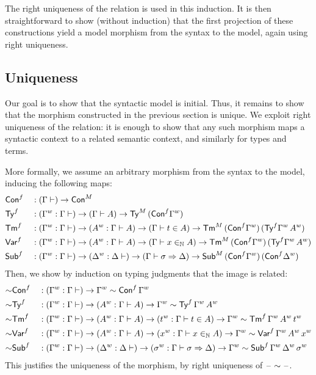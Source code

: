   The right uniqueness of the relation is used in this induction. It is then
straightforward to show (without induction) that the first projection of these
constructions yield a model morphism from the syntax to the model, again using
right uniqueness.
\subsection{Uniqueness}
Our goal is to show that the syntactic model is initial. Thus, it remains to
show that the morphism constructed in the previous section is unique. We exploit
right uniqueness of the relation: it is enough to show that any such morphism
maps a syntactic context to a related semantic context, and similarly for types
and terms.

More formally, we assume an arbitrary morphism from the
syntax to the model, inducing the following maps:
\begin{alignat*}{5}
  &
  {\mathsf{Con}}^f
  && :
   (\Gamma \vdash) \rightarrow {\mathsf{Con}}^M
   \\
  &
  {\mathsf{Ty}}^f
  && :
   ({\Gamma}^w:\Gamma \vdash) \rightarrow (\Gamma\vdash A)\rightarrow{\mathsf{Ty}}^M\,({\mathsf{Con}}^f{\Gamma}^w)
   \\
  &
  {\mathsf{Tm}}^f
  && :
  ({\Gamma}^w:\Gamma \vdash) \rightarrow ({A}^w:\Gamma\vdash A)\rightarrow
  (\Gamma\vdash t \in A)\rightarrow{\mathsf{Tm}}^M\,({\mathsf{Con}}^f{\Gamma}^w)\,
  ({\mathsf{Ty}}^f{\Gamma}^w\,{A}^w)
   \\
  &
  {\mathsf{Var}}^f
  && :
  ({\Gamma}^w:\Gamma \vdash) \rightarrow ({A}^w:\Gamma\vdash A)\rightarrow
  (\Gamma\vdash x \in_{\mathbb{N}} A)\rightarrow{\mathsf{Tm}}^M\,({\mathsf{Con}}^f{\Gamma}^w)\,
  ({\mathsf{Ty}}^f{\Gamma}^w\,{A}^w)
   \\
  &
  {\mathsf{Sub}}^f
  && :
  ({\Gamma}^w:\Gamma \vdash) \rightarrow
  ({\Delta}^w:\Delta \vdash) \rightarrow
  (\Gamma\vdash \sigma \Rightarrow \Delta)\rightarrow{\mathsf{Sub}}^M\,({\mathsf{Con}}^f{\Gamma}^w)\,
  ({\mathsf{Con}}^f{\Delta}^w)
\end{alignat*}
Then, we show by induction on typing judgments that
the image is related:
\begin{alignat*}{5}
  &
  {\sim}{\mathsf{Con}}^f
  && :
  ({\Gamma}^w : \Gamma \vdash) \rightarrow {\Gamma}^w\sim {\mathsf{Con}}^f\,{\Gamma}^w
  \\
  &
  {\sim}{\mathsf{Ty}}^f
  && :
  ({\Gamma}^w : \Gamma \vdash) \rightarrow
  ({A}^w : \Gamma \vdash A) \rightarrow
  {\Gamma}^w\sim {\mathsf{Ty}}^f\,{\Gamma}^w\,{A}^w
  \\
  &
  {\sim}{\mathsf{Tm}}^f
  && :
  ({\Gamma}^w : \Gamma \vdash) \rightarrow
  ({A}^w : \Gamma \vdash A) \rightarrow
  ({t}^w : \Gamma \vdash t \in A) \rightarrow
  {\Gamma}^w\sim {\mathsf{Tm}}^f\,{\Gamma}^w\,{A}^w\,{t}^w
  \\
  &
  {\sim}{\mathsf{Var}}^f
  && :
  ({\Gamma}^w : \Gamma \vdash) \rightarrow
  ({A}^w : \Gamma \vdash A) \rightarrow
  ({x}^w : \Gamma \vdash x \in_{\mathbb{N}} A) \rightarrow
  {\Gamma}^w\sim {\mathsf{Var}}^f\,{\Gamma}^w\,{A}^w\,{x}^w
  \\
  &
  {\sim}{\mathsf{Sub}}^f
  && :
  ({\Gamma}^w : \Gamma \vdash) \rightarrow
  ({\Delta}^w : \Delta \vdash) \rightarrow
  ({\sigma}^w : \Gamma \vdash \sigma \Rightarrow \Delta) \rightarrow
  {\Gamma}^w\sim {\mathsf{Sub}}^f\,{\Gamma}^w\,{\Delta}^w\,{\sigma}^w
\end{alignat*}
This justifies the uniqueness of the morphism, by right uniqueness of
$\mathord{\hspace{1pt}\text{--}\hspace{1pt}}\sim\mathord{\hspace{1pt}\text{--}\hspace{1pt}}$.


